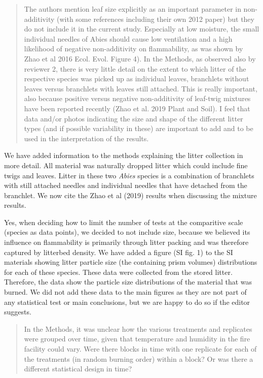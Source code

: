 \documentclass[letterpaper, 12pt]{letter}
\begin{document}
\begin{letter}{}
\begin{quote}
The authors mention leaf size explicitly as an important parameter in non-additivity (with some references including their own 2012 paper) but they do not include it in the current study. Especially at low moisture, the small individual needles of Abies should cause low ventilation and a high likelihood of negative non-additivity on flammability, as was shown by Zhao et al 2016 Ecol. Evol. Figure 4). In the Methods, as observed also by reviewer 2, there is very little detail on the extent to which litter of the respective species was picked up as individual leaves, branchlets without leaves versus branchlets with leaves still attached. This is really important, also because positive versus negative non-additivity of leaf-twig mixtures have been reported recently (Zhao et al. 2019 Plant and Soil). I feel that data and/or photos indicating the size and shape of the different litter types (and if possible variability in these) are important to add and to be used in the interpretation of the results.
\end{quote}

We have added information to the methods explaining the litter collection in more detail. All material was naturally dropped litter which could include fine twigs and leaves. Litter in these two \emph{Abies} species is a combination of branchlets with still attached needles and individual needles that have detached from the branchlet.  We now cite the Zhao et al (2019) results when discussing the mixture results.

Yes, when deciding how to limit the number of tests at the comparitive scale (species as data points), we decided to not include size, because we believed its influence on flammability is primarily through litter packing and was therefore captured by litterbed density. We have added a figure (SI fig. 1) to the SI materials showing litter particle size (the containing prism volumes) distributions for each of these species. These data were collected from the stored litter. Therefore, the data show the particle size distributions of the material that was burned. We did not add these data to the main figures as they are not part of any statistical test or main conclusions, but we are happy to do so if the editor suggests.


\begin{quote}
In the Methods, it was unclear how the various treatments and replicates were grouped over time, given that temperature and humidity in the fire facility could vary. Were there blocks in time with one replicate for each of the treatments (in random burning order) within a block? Or was there a different statistical design in time? 
\end{quote}


\end{letter}
\end{document}
